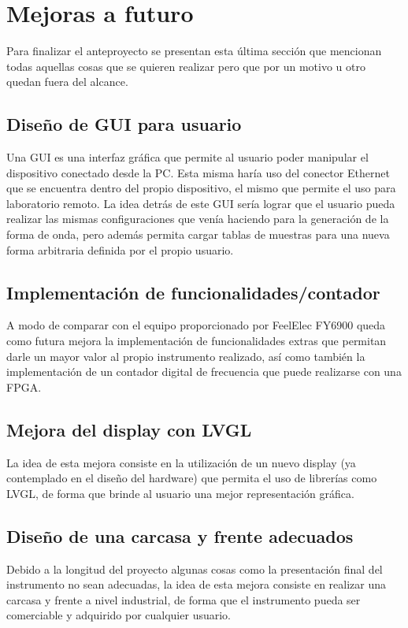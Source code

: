 \section{Mejoras a futuro}
Para finalizar el anteproyecto se presentan esta última sección que mencionan todas aquellas cosas que se quieren realizar pero que por un motivo u otro quedan fuera del alcance.

\subsection{Diseño de GUI para usuario}
Una GUI es una interfaz gráfica que permite al usuario poder manipular el dispositivo conectado desde la PC. Esta misma haría uso del conector Ethernet que se encuentra dentro del propio dispositivo, el mismo que permite el uso para laboratorio remoto. La idea detrás de este GUI sería lograr que el usuario pueda realizar las mismas configuraciones que venía haciendo para la generación de la forma de onda, pero además permita cargar tablas de muestras para una nueva forma arbitraria definida por el propio usuario.

\subsection{Implementación de funcionalidades/contador}
A modo de comparar con el equipo proporcionado por FeelElec FY6900 queda como futura mejora la implementación de funcionalidades extras que permitan darle un mayor valor al propio instrumento realizado, así como también la implementación de un contador digital de frecuencia que puede realizarse con una FPGA.

\subsection{Mejora del display con LVGL}
La idea de esta mejora consiste en la utilización de un nuevo display (ya contemplado en el diseño del hardware) que permita el uso de librerías como LVGL, de forma que brinde al usuario una mejor representación gráfica.

\subsection{Diseño de una carcasa y frente adecuados}
Debido a la longitud del proyecto algunas cosas como la presentación final del instrumento no sean adecuadas, la idea de esta mejora consiste en realizar una carcasa y frente a nivel industrial, de forma que el instrumento pueda ser comerciable y adquirido por cualquier usuario.

